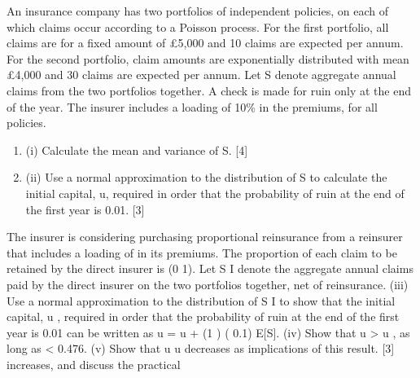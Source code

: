 \documentclass[a4paper,12pt]{article}
\begin{document}
\item An insurance company has two portfolios of independent policies, on each of which claims occur according to a Poisson process. For the first portfolio, all claims are for a fixed amount of £5,000 and 10 claims are expected per annum. For the second
portfolio, claim amounts are exponentially distributed with mean £4,000 and 30
claims are expected per annum.
Let S denote aggregate annual claims from the two portfolios together.
A check is made for ruin only at the end of the year.
The insurer includes a loading of 10\% in the premiums, for all policies.
\begin{enumerate}
\item (i) Calculate the mean and variance of S. [4]
\item (ii) Use a normal approximation to the distribution of S to calculate the initial capital, u, required in order that the probability of ruin at the end of the first year is 0.01. [3]
\end{enumerate}
\item The insurer is considering purchasing proportional reinsurance from a reinsurer that includes a loading of in its premiums. The proportion of each claim to be retained by the direct insurer is (0
1).
Let S I denote the aggregate annual claims paid by the direct insurer on the two portfolios together, net of reinsurance.
(iii)
Use a normal approximation to the distribution of S I to show that the initial capital, u , required in order that the probability of ruin at the end of the first
year is 0.01 can be written as
u = u + (1
) (
0.1) E[S].
(iv) Show that u > u , as long as < 0.476.
(v) Show that u u decreases as
implications of this result.
[3]
increases, and discuss the practical
\end{document}
